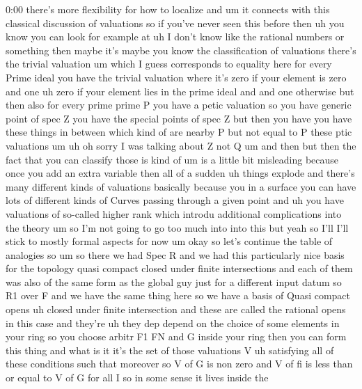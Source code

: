 \begin{unfinished}{0:00}
there's  more  flexibility  for  how  to
localize  and  um  it  connects  with  this
classical  discussion  of  valuations  so  if
you've  never  seen  this  before  then  uh
you  know  you  can  look  for  example  at  uh
I  don't  know  like  the
rational  numbers  or  something  then  maybe
it's  maybe  you  know  the  classification
of  valuations  there's  the  trivial
valuation  um  which  I  guess  corresponds
to  equality  here  for  every  Prime  ideal
you  have  the  trivial  valuation  where
it's  zero  if  your  element  is  zero  and
one  uh  zero  if  your  element  lies  in  the
prime  ideal  and  and  one  otherwise  but
then  also  for  every  prime  prime  P  you
have  a  petic  valuation  so  you  have
generic  point  of  spec  Z  you  have  the
special  points  of  spec  Z  but  then  you
have  you  have  these  things  in  between
which  kind  of  are  nearby  P  but  not  equal
to  P  these  ptic  valuations  um  uh  oh
sorry  I  was  talking  about  Z  not  Q  um  and
then  but  then  the  fact  that  you  can
classify  those  is  kind  of  um  is  a  little
bit  misleading  because  once  you  add  an
extra  variable  then  all  of  a  sudden
uh  things  explode  and  there's  many
different  kinds  of  valuations  basically
because  you  in  a  surface  you  can  have
lots  of  different  kinds  of  Curves
passing  through  a  given  point  and  uh  you
have  valuations  of  so-called  higher  rank
which  introdu  additional  complications
into  the  theory  um  so  I'm  not  going  to
go  too  much  into  into  this  but  yeah  so
I'll  I'll  stick  to  mostly  formal  aspects
for
now  um  okay  so  let's  continue  the  table
of  analogies
so  um  so  there  we  had  Spec  R  and  we  had
this  particularly  nice  basis  for  the
topology  quasi  compact  closed  under
finite  intersections  and  each  of  them
was  also  of  the  same  form  as  the  global
guy  just  for  a  different  input  datum  so
R1  over  F  and  we  have  the  same  thing
here  so  we  have  a
basis  of  Quasi  compact
opens  uh  closed
under  finite
intersection  and  these  are  called  the
rational  opens  in  this
case  and  they're
uh  they  dep  depend  on  the  choice  of  some
elements  in  your  ring  so  you  choose
arbitr
F1  FN  and  G  inside  your  ring  then  you
can  form  this  thing  and  what  is  it  it's
the  set  of  those  valuations  V  uh
satisfying  all  of  these  conditions  such
that  moreover  so  V  of  G  is  non  zero  and
V  of  fi  is  less  than  or  equal  to  V  of  G
for  all
I
so  in  some  sense  it  lives  inside  the

\end{unfinished}
